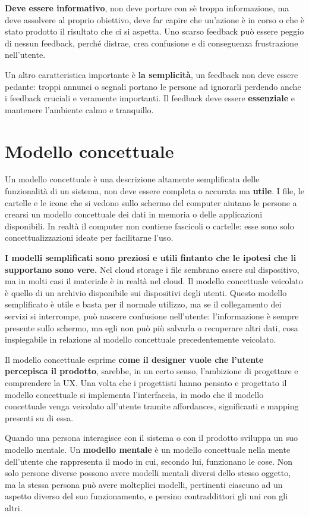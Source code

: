 \textbf{Deve essere informativo}, non deve portare con sè troppa informazione, ma deve assolvere al proprio obiettivo, deve far capire che un'azione è in corso o che è stato prodotto il risultato che ci si aspetta. Uno scarso feedback può essere peggio di nessun feedback, perché distrae, crea confusione e di conseguenza frustrazione nell'utente.

Un altro caratteristica importante è \textbf{la semplicità}, un feedback non deve essere pedante: troppi annunci o segnali portano le persone ad ignorarli perdendo anche i feedback cruciali e veramente importanti. Il feedback deve essere \textbf{essenziale} e mantenere l'ambiente calmo e tranquillo.

\section{Modello concettuale}
Un modello concettuale è una descrizione altamente semplificata delle funzionalità di un sistema, non deve essere completa o accurata ma \textbf{utile}. I file, le cartelle e le icone che si vedono sullo schermo del computer aiutano le persone a crearsi un modello concettuale dei dati in memoria o delle applicazioni disponibili. In realtà il computer non contiene fascicoli o cartelle: esse sono solo concettualizzazioni ideate per facilitarne l'uso.

\textbf{I modelli semplificati sono preziosi e utili fintanto che le ipotesi che li supportano sono vere.} Nel cloud storage i file sembrano essere sul dispositivo, ma in molti casi il materiale è in realtà nel cloud. Il modello concettuale veicolato è quello di un archivio disponibile sui dispositivi degli utenti. Questo modello semplificato è utile e basta per il normale utilizzo, ma se il collegamento dei servizi si interrompe, può nascere confusione nell'utente: l'informazione è sempre presente sullo schermo, ma egli non può più salvarla o recuperare altri dati, cosa inspiegabile in relazione al modello concettuale precedentemente veicolato.

Il modello concettuale esprime \textbf{come il designer vuole che l'utente percepisca il prodotto}, sarebbe, in un certo senso, l'ambizione di progettare e comprendere la UX. Una volta che i progettisti hanno pensato e progettato il modello concettuale si implementa l'interfaccia, in modo che il modello concettuale venga veicolato all'utente tramite affordances, significanti e mapping presenti su di essa.

Quando una persona interagisce con il sistema o con il prodotto sviluppa un suo modello mentale. Un \textbf{modello mentale} è un modello concettuale nella mente dell'utente che rappresenta il modo in cui, secondo lui, funzionano le cose. Non solo persone diverse possono avere modelli mentali diversi dello stesso oggetto, ma la stessa persona può avere molteplici modelli, pertinenti ciascuno ad un aspetto diverso del suo funzionamento, e persino contraddittori gli uni con gli altri.

